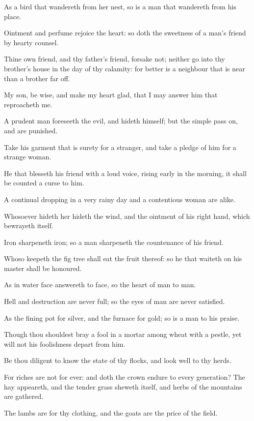 \Verse As a bird that wandereth from her nest, so is a man that wandereth from his place.

\Verse Ointment and perfume rejoice the heart: so doth the sweetness of a man's friend by hearty counsel.

\Verse Thine own friend, and thy father's friend, forsake not; neither go into thy brother's house in the day of thy calamity: for better is a neighbour that is near than a brother far off.

\Verse My son, be wise, and make my heart glad, that I may answer him that reproacheth me.

\Verse A prudent man foreseeth the evil, and hideth himself; but the simple pass on, and are punished.

\Verse Take his garment that is surety for a stranger, and take a pledge of him for a strange woman.

\Verse He that blesseth his friend with a loud voice, rising early in the morning, it shall be counted a curse to him.

\Verse A continual dropping in a very rainy day and a contentious woman are alike.

\Verse Whosoever hideth her hideth the wind, and the ointment of his right hand, which bewrayeth itself.

\Verse Iron sharpeneth iron; so a man sharpeneth the countenance of his friend.

\Verse Whoso keepeth the fig tree shall eat the fruit thereof: so he that waiteth on his master shall be honoured.

\Verse As in water face answereth to face, so the heart of man to man.

\Verse Hell and destruction are never full; so the eyes of man are never satisfied.

\Verse As the fining pot for silver, and the furnace for gold; so is a man to his praise.

\Verse Though thou shouldest bray a fool in a mortar among wheat with a pestle, yet will not his foolishness depart from him.

\Verse Be thou diligent to know the state of thy flocks, and look well to thy herds.

\Verse For riches are not for ever: and doth the crown endure to every generation?  \Verse The hay appeareth, and the tender grass sheweth itself, and herbs of the mountains are gathered.

\Verse The lambs are for thy clothing, and the goats are the price of the field.

